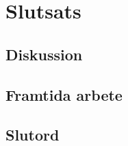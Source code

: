 \chapter{Slutsats}

\lipsum[60]

\section{Diskussion}

\lipsum[61-63]

\section{Framtida arbete}

\lipsum[64-65]

\section{Slutord}

\lipsum[66]
